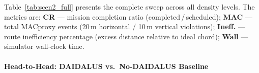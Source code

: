 Table~\ref{tab:scen2_full} presents the complete sweep across all density levels. The metrics
are: \textbf{CR} --- mission completion ratio (completed\,/\,scheduled);
\textbf{MAC} --- total MACproxy events (20\,m horizontal / 10\,m vertical violations);
\textbf{Ineff.} --- route inefficiency percentage (excess distance relative to ideal chord);
\textbf{Wall} --- simulator wall-clock time.

\begin{table}[htbp]
\caption{DAIDALUS Scalability Sweep --- Scenario 2, 1-hour window, 10\,Hz physics,
$N = 50$ to $N = 1{,}000$.}
\label{tab:scen2_full}
\centering
\renewcommand{\arraystretch}{1.2}
\end{table}


\paragraph{Head-to-Head: DAIDALUS vs.\ No-DAIDALUS Baseline}
\label{sec:daidalus_vs_baseline}

